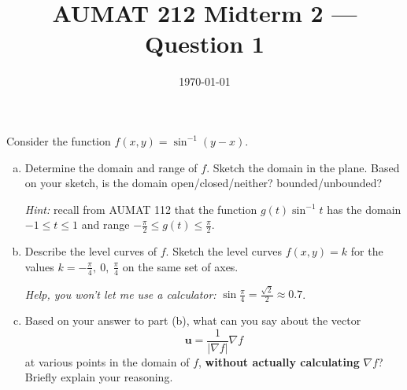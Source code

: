\documentclass[12pt,a4paper]{article}
\title{AUMAT 212 Midterm 2 --- Question 1}
\date{\today}
\begin{document}
    \begin{problem}
        Consider the function \(f(x,y) = \sin^{-1}(y-x)\).
        \begin{enumerate}[(a)]
            \item Determine the domain and range  of \(f\). Sketch the domain in the plane. Based on your sketch, is the domain open/closed/neither? bounded/unbounded?
            
            \emph{Hint:} recall from AUMAT 112  that the function \(g(t) \sin^{-1} t\) has the domain \(-1 \leq t \leq 1\) and range \(-\frac{\pi}{2} \leq g(t) \leq \frac{\pi}{2}\).

            \item Describe the level curves of \(f\). Sketch the level curves \(f(x,y) = k\) for the values \(k = -\frac{\pi}{4}, \ 0, \ \frac{\pi}{4}\) on the same set of axes.
            
            \textit{Help, you won't let me use a calculator:} \(\sin{} \frac{\pi}{4} = \frac{\sqrt{2}}{2} \approx 0.7\).

            \item Based on your answer to part (b), what can you say about the vector \[\mathbf{u} = \frac{1}{\left| \nabla f \right|} \nabla f\] at various points in the domain of \(f\), \textbf{without actually calculating} \(\nabla f\)? Briefly explain your reasoning.
        \end{enumerate}
    \end{problem}
\end{document}
